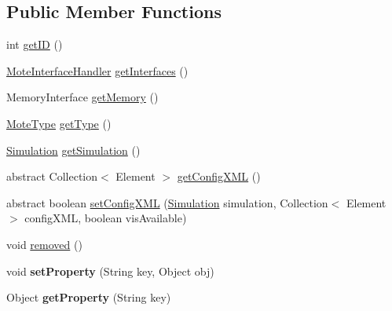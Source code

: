 \subsection*{Public Member Functions}
\begin{DoxyCompactItemize}
\item 
int \hyperlink{interfaceorg_1_1contikios_1_1cooja_1_1Mote_ace9d66ac50f3dba7ae725a16a8172aa6}{get\-I\-D} ()
\item 
\hyperlink{classorg_1_1contikios_1_1cooja_1_1MoteInterfaceHandler}{Mote\-Interface\-Handler} \hyperlink{interfaceorg_1_1contikios_1_1cooja_1_1Mote_a37bc264ef32cdd78b2b126d83e7a42d4}{get\-Interfaces} ()
\item 
Memory\-Interface \hyperlink{interfaceorg_1_1contikios_1_1cooja_1_1Mote_a239aebd679450f6face2073f0599a13f}{get\-Memory} ()
\item 
\hyperlink{interfaceorg_1_1contikios_1_1cooja_1_1MoteType}{Mote\-Type} \hyperlink{interfaceorg_1_1contikios_1_1cooja_1_1Mote_ab8120b25191f1101e79f1986ac90639c}{get\-Type} ()
\item 
\hyperlink{classorg_1_1contikios_1_1cooja_1_1Simulation}{Simulation} \hyperlink{interfaceorg_1_1contikios_1_1cooja_1_1Mote_abda92c72b3264208f6d3c1deb7cc6a6e}{get\-Simulation} ()
\item 
abstract Collection$<$ Element $>$ \hyperlink{interfaceorg_1_1contikios_1_1cooja_1_1Mote_a588f56dddb96a6f996ebe99264e4cba3}{get\-Config\-X\-M\-L} ()
\item 
abstract boolean \hyperlink{interfaceorg_1_1contikios_1_1cooja_1_1Mote_afd2320eec3cd8dc02f80286b40f1ad3a}{set\-Config\-X\-M\-L} (\hyperlink{classorg_1_1contikios_1_1cooja_1_1Simulation}{Simulation} simulation, Collection$<$ Element $>$ config\-X\-M\-L, boolean vis\-Available)
\item 
void \hyperlink{interfaceorg_1_1contikios_1_1cooja_1_1Mote_a03fcd439ae5bec154da6146925971f28}{removed} ()
\item 
\hypertarget{interfaceorg_1_1contikios_1_1cooja_1_1Mote_ad8d19948b08e53093123aff13c3e4e49}{void {\bfseries set\-Property} (String key, Object obj)}\label{interfaceorg_1_1contikios_1_1cooja_1_1Mote_ad8d19948b08e53093123aff13c3e4e49}

\item 
\hypertarget{interfaceorg_1_1contikios_1_1cooja_1_1Mote_a28c82cca6413b812bc8e815a30f8041d}{Object {\bfseries get\-Property} (String key)}\label{interfaceorg_1_1contikios_1_1cooja_1_1Mote_a28c82cca6413b812bc8e815a30f8041d}

\end{DoxyCompactItemize}


